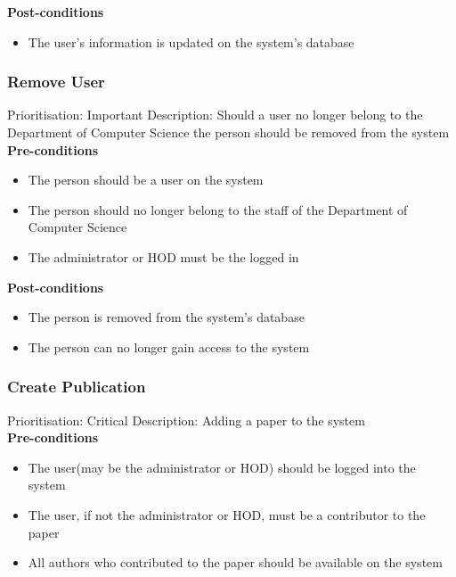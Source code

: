 \documentclass[a4paper]{article}
\begin{document}
    \textbf{Post-conditions}
    \begin{itemize}
        \item The user's information is updated on the system's database
    \end{itemize}
    
    \subsubsection{Remove User}
    Prioritisation: Important
    Description: Should a user no longer belong to the Department of Computer Science the person should be removed from the system\\
    
    \textbf{Pre-conditions}
     \begin{itemize}
        \item The person should be a user on the system
        \item The person should no longer belong to the staff of the Department of Computer Science
        \item The administrator or HOD must be the logged in
   \end{itemize}
    
    \textbf{Post-conditions}
    \begin{itemize}
        \item The person is removed from the system's database
        \item The person can no longer gain access to the system
    \end{itemize}

    \subsubsection{Create Publication}
    Prioritisation: Critical
    Description: Adding a paper to the system\\
    
    \textbf{Pre-conditions}
     \begin{itemize}
        \item The user(may be the administrator or HOD) should be logged into the system
        \item The user, if not the administrator or HOD, must be a contributor to the paper
        \item All authors who contributed to the paper should be available on the system
   \end{itemize}
    
\end{document}
